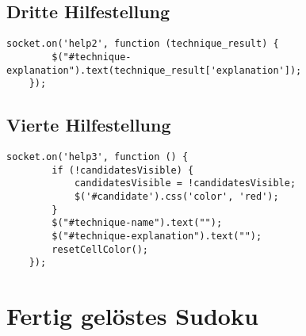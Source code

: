 \subsection{Dritte Hilfestellung}
\begin{lstlisting}[caption={Dritte Hilfestellung}, label={lst:help2}]
	socket.on('help2', function (technique_result) {
		$("#technique-explanation").text(technique_result['explanation']);
	});
\end{lstlisting}

\subsection{Vierte Hilfestellung}
\begin{lstlisting}[caption={Vierte Hilfestellung}, label={lst:help3}]
	socket.on('help3', function () {
		if (!candidatesVisible) {
			candidatesVisible = !candidatesVisible;
			$('#candidate').css('color', 'red');
		}
		$("#technique-name").text("");
		$("#technique-explanation").text("");
		resetCellColor();
	});
\end{lstlisting}

\section{Fertig gelöstes Sudoku}